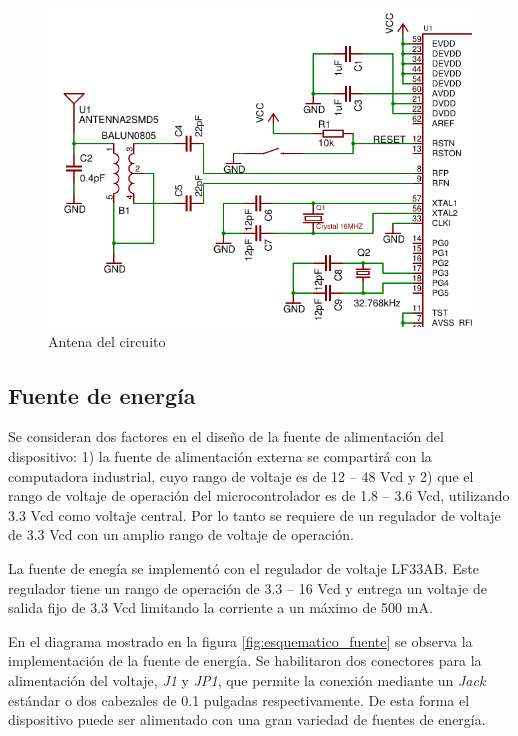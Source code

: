 \begin{figure}
	\centering
	\includegraphics[scale=0.8]{capitulo_3_imgs/esquematico_antena.pdf}
	\caption{Antena del circuito}	
	\label{fig:esquematico_antena}
\end{figure}

\subsection{Fuente de energía}

Se consideran dos factores en el diseño de la fuente de alimentación del dispositivo: 1) la fuente de alimentación externa se compartirá con la computadora industrial, cuyo rango de voltaje es de 12 -- 48 Vcd y 2) que el rango de voltaje de operación del microcontrolador es de 1.8 -- 3.6 Vcd, utilizando 3.3 Vcd como voltaje central. Por lo tanto se requiere de un regulador de voltaje de 3.3 Vcd con un amplio rango de voltaje de operación. 

La fuente de enegía se implementó con el regulador de voltaje LF33AB\cite{dev:regulador}. Este regulador tiene un rango de operación de 3.3 -- 16 Vcd y entrega un voltaje de salida fijo de 3.3 Vcd limitando la corriente a un máximo de 500 mA. 

En el diagrama mostrado en la figura \ref{fig:esquematico_fuente} se observa la implementación de la fuente de energía. Se habilitaron dos conectores para la alimentación del voltaje, \textit{J1} y \textit{JP1}, que permite la conexión mediante un \textit{Jack} estándar o dos cabezales de 0.1 pulgadas respectivamente. De esta forma el dispositivo puede ser alimentado con una gran variedad de fuentes de energía. 

